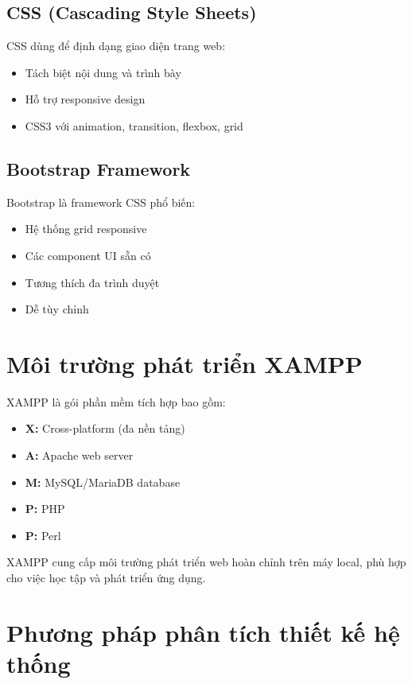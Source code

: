 \documentclass[a4paper,12pt]{report}
\begin{document}
\subsection{CSS (Cascading Style Sheets)}
CSS dùng để định dạng giao diện trang web:
\begin{itemize}
    \item Tách biệt nội dung và trình bày
    \item Hỗ trợ responsive design
    \item CSS3 với animation, transition, flexbox, grid
\end{itemize}

\subsection{Bootstrap Framework}
Bootstrap là framework CSS phổ biến:
\begin{itemize}
    \item Hệ thống grid responsive
    \item Các component UI sẵn có
    \item Tương thích đa trình duyệt
    \item Dễ tùy chỉnh
\end{itemize}

\section{Môi trường phát triển XAMPP}

XAMPP là gói phần mềm tích hợp bao gồm:
\begin{itemize}
    \item \textbf{X:} Cross-platform (đa nền tảng)
    \item \textbf{A:} Apache web server
    \item \textbf{M:} MySQL/MariaDB database
    \item \textbf{P:} PHP
    \item \textbf{P:} Perl
\end{itemize}

XAMPP cung cấp môi trường phát triển web hoàn chỉnh trên máy local, phù hợp cho việc học tập và phát triển ứng dụng.

\section{Phương pháp phân tích thiết kế hệ thống}
\end{document}
